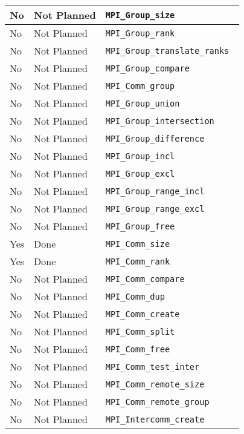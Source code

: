 \documentclass{report}
\begin{document}
\begin{tabular}{|l|l|l|}
No             & Not Planned        & \verb|MPI_Group_size| \\ \hline
No             & Not Planned        & \verb|MPI_Group_rank| \\ \hline
No             & Not Planned        & \verb|MPI_Group_translate_ranks | \\ \hline
No             & Not Planned        & \verb|MPI_Group_compare| \\ \hline
No             & Not Planned        & \verb|MPI_Comm_group| \\ \hline
No             & Not Planned        & \verb|MPI_Group_union| \\ \hline
No             & Not Planned        & \verb|MPI_Group_intersection| \\ \hline
No             & Not Planned        & \verb|MPI_Group_difference| \\ \hline
No             & Not Planned        & \verb|MPI_Group_incl| \\ \hline
No             & Not Planned        & \verb|MPI_Group_excl| \\ \hline
No             & Not Planned        & \verb|MPI_Group_range_incl| \\ \hline
No             & Not Planned        & \verb|MPI_Group_range_excl| \\ \hline
No             & Not Planned        & \verb|MPI_Group_free| \\ \hline
Yes            & Done               & \verb|MPI_Comm_size| \\ \hline
Yes            & Done               & \verb|MPI_Comm_rank| \\ \hline
No             & Not Planned        & \verb|MPI_Comm_compare| \\ \hline
No             & Not Planned        & \verb|MPI_Comm_dup| \\ \hline
No             & Not Planned        & \verb|MPI_Comm_create| \\ \hline
No             & Not Planned        & \verb|MPI_Comm_split| \\ \hline
No             & Not Planned        & \verb|MPI_Comm_free| \\ \hline
No             & Not Planned        & \verb|MPI_Comm_test_inter| \\ \hline
No             & Not Planned        & \verb|MPI_Comm_remote_size| \\ \hline
No             & Not Planned        & \verb|MPI_Comm_remote_group| \\ \hline
No             & Not Planned        & \verb|MPI_Intercomm_create| \\ \hline

\end{tabular}
\end{document}
